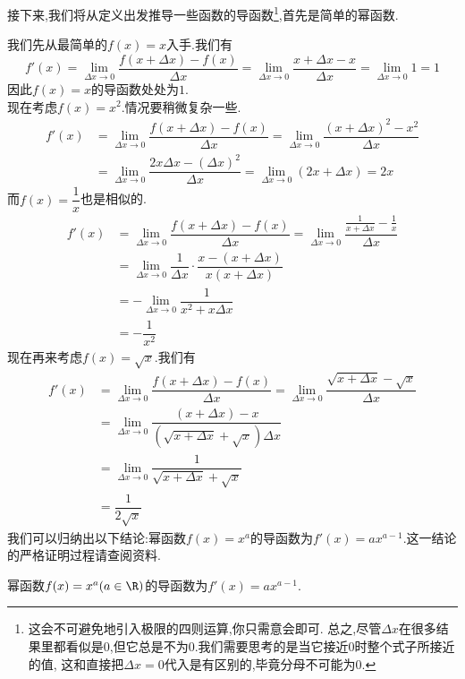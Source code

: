 \documentclass{ctexart}
\begin{document}
\indent 接下来,我们将从定义出发推导一些函数的导函数\footnote{这会不可避免地引入极限的四则运算,你只需意会即可.%
总之,尽管$\Delta x$在很多结果里都看似是$0$,但它总是不为$0$.我们需要思考的是当它接近$0$时整个式子所接近的值,%
这和直接把$\Delta x=0$代入是有区别的,毕竟分母不可能为$0$.},首先是简单的幂函数.
\begin{derivation}
    我们先从最简单的$f(x)=x$入手.我们有
    \[f'(x)=\lim_{\Delta x\to0}\dfrac{f(x+\Delta x)-f(x)}{\Delta x}
    =\lim_{\Delta x\to0}\dfrac{x+\Delta x-x}{\Delta x}=\lim_{\Delta x\to0}1=1\]
    因此$f(x)=x$的导函数处处为$1$.\\
    现在考虑$f(x)=x^2$.情况要稍微复杂一些.
    \[\begin{aligned}
        f'(x)
        &= \lim_{\Delta x\to0}\dfrac{f(x+\Delta x)-f(x)}{\Delta x}=\lim_{\Delta x\to0}\dfrac{(x+\Delta x)^2-x^2}{\Delta x} \\
        &= \lim_{\Delta x\to0}\dfrac{2x\Delta x-(\Delta x)^2}{\Delta x}=\lim_{\Delta x\to0}(2x+\Delta x)=2x
    \end{aligned}\]
    而$f(x)=\dfrac1x$也是相似的.
    \[\begin{aligned}
        f'(x)
        &= \lim_{\Delta x\to0}\dfrac{f(x+\Delta x)-f(x)}{\Delta x}=\lim_{\Delta x\to0}\dfrac{\frac{1}{x+\Delta x}-\frac1x}{\Delta x} \\
        &= \lim_{\Delta x\to0}\dfrac{1}{\Delta x}\cdot\dfrac{x-(x+\Delta x)}{x(x+\Delta x)} \\
        &= -\lim_{\Delta x\to0}\dfrac{1}{x^2+x\Delta x} \\
        &= -\dfrac1{x^2}
    \end{aligned}\]
    现在再来考虑$f(x)=\sqrt{x}$.我们有
    \[\begin{aligned}
        f'(x)
        &= \lim_{\Delta x\to0}\dfrac{f(x+\Delta x)-f(x)}{\Delta x}=\lim_{\Delta x\to0}\dfrac{\sqrt{x+\Delta x}-\sqrt{x}}{\Delta x} \\
        &= \lim_{\Delta x\to0}\dfrac{(x+\Delta x)-x}{\left(\sqrt{x+\Delta x}+\sqrt{x}\right)\Delta x} \\
        &= \lim_{\Delta x\to0}\dfrac{1}{\sqrt{x+\Delta x}+\sqrt{x}} \\
        &= \dfrac{1}{2\sqrt{x}}
    \end{aligned}\]
    我们可以归纳出以下结论:幂函数$f(x)=x^a$的导函数为$f'(x)=ax^{a-1}$.这一结论的严格证明过程请查阅资料.
\end{derivation}
\begin{theorem}[0A.1.2 幂函数的导数]
    幂函数$f(x)=x^a(a\in\R)$的导函数为$f'(x)=ax^{a-1}$.
\end{theorem}
\end{document}
